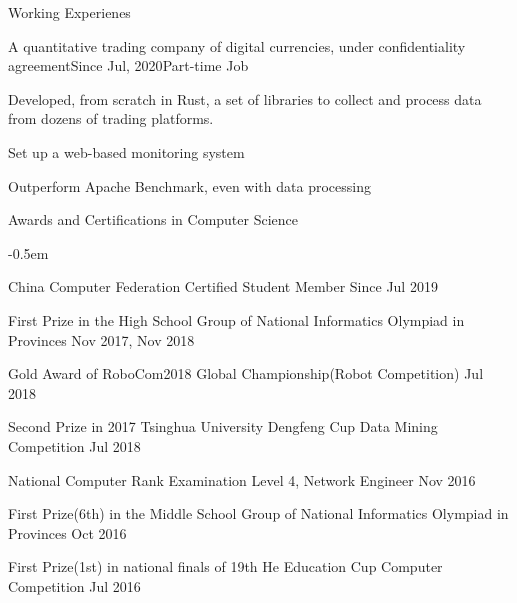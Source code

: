 \documentclass{resume} %
\begin{document}
\begin{rSection}{Working Experienes}
    \begin{rSubsection}{A quantitative trading company of digital currencies, under confidentiality agreement}{Since Jul, 2020}{Part-time Job}{}
        \item Developed, from scratch in Rust, a set of libraries to collect and process data from dozens of trading platforms.
        \item Set up a web-based monitoring system
        \item Outperform Apache Benchmark, even with data processing
\end{rSubsection}

\end{rSection}
\begin{rSection}{Awards and Certifications in Computer Science}
    \begin{list}{}{
        \setlength{\leftmargin}{0.0em}
        \itemsep -0.5em
      }

    
    \item China Computer Federation Certified Student Member \hfill Since Jul 2019

    \item First Prize in the High School Group of National Informatics Olympiad in Provinces \hfill Nov 2017, Nov 2018
    \item Gold Award of RoboCom2018 Global Championship(Robot Competition) \hfill Jul 2018
    \item Second Prize in 2017 Tsinghua University Dengfeng Cup Data Mining Competition \hfill Jul 2018
    \item National Computer Rank Examination Level 4, Network Engineer \hfill Nov 2016
    \item First Prize(6th) in the Middle School Group of National Informatics Olympiad in Provinces \hfill Oct 2016
    \item First Prize(1st) in national finals of 19th He Education Cup Computer Competition \hfill Jul 2016
    

\end{list}
\end{rSection}
\end{document}

